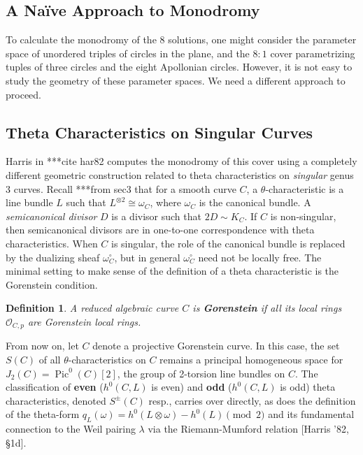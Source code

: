 \documentclass[11pt,a4paper]{article}
\newcommand{\Pic}{\operatorname{Pic}}
\theoremstyle{mytheoremstyle}
\theoremstyle{mydefinitionstyle}
\newtheorem{definition}[theorem]{Definition}
\newcommand{\HarrisThetaCite}[1]{[Harris '82, \S#1]}
\begin{document}
\subsection{A Naïve Approach to Monodromy}

To calculate the monodromy of the $8$ solutions, one might consider the parameter space of unordered triples of circles in the plane, and the $8:1$ cover parametrizing tuples of three circles and the eight Apollonian circles. However, it is not easy to study the geometry of these parameter spaces. We need a different approach to proceed.

\subsection{Theta Characteristics on Singular Curves}

Harris in ***cite har82 computes the monodromy of this cover using a completely different geometric construction related to theta characteristics on \textit{singular} genus 3 curves. Recall ***from sec3 that for a smooth curve $C$, a $\theta$-characteristic is a line bundle $L$ such that $L^{\otimes 2} \cong \omega_C$, where $\omega_C$ is the canonical bundle. A \textit{semicanonical divisor} $D$ is a divisor such that $2D\sim K_C$. If $C$ is non-singular, then semicanonical divisors are in one-to-one correspondence with theta characteristics. When $C$ is singular, the role of the canonical bundle is replaced by the dualizing sheaf $\omega_C^{\circ}$, but in general $\omega_C^{\circ}$ need not be locally free. The minimal setting to make sense of the definition of a theta characteristic is the Gorenstein condition. 
\begin{definition}
A reduced algebraic curve $C$ is \textbf{Gorenstein} if all its local rings $\mathcal{O}_{C,p}$ are Gorenstein local rings.
\end{definition}
From now on, let $C$ denote a projective Gorenstein curve. In this case, the set $S(C)$ of all $\theta$-characteristics on $C$ remains a principal homogeneous space for $J_2(C) = \Pic^0(C)[2]$, the group of 2-torsion line bundles on $C$. The classification of \textbf{even} ($h^0(C,L)$ is even) and \textbf{odd} ($h^0(C,L)$ is odd) theta characteristics, denoted $S^\pm(C)$ resp., carries over directly, as does the definition of the theta-form $q_L(\omega) = h^0(L \otimes \omega) - h^0(L) \pmod 2$ and its fundamental connection to the Weil pairing $\lambda$ via the Riemann-Mumford relation \HarrisThetaCite{1d}. 
\end{document}
